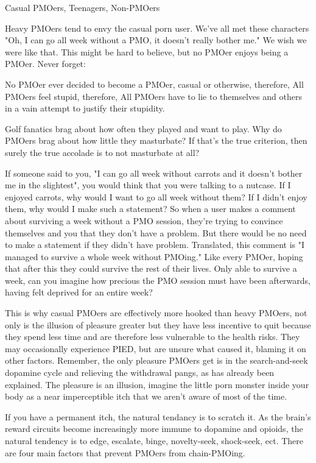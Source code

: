 Casual PMOers, Teenagers, Non-PMOers

Heavy PMOers tend to envy the casual porn user. We've all met these characters "Oh, I can go all week without a PMO, it doesn't really bother me." We wish we were like that. This might be hard to believe, but no PMOer enjoys being a PMOer. Never forget:

  No PMOer ever decided to become a PMOer, casual or otherwise, therefore,
  All PMOers feel stupid, therefore,
  All PMOers have to lie to themselves and others in a vain attempt to justify their stupidity.

Golf fanatics brag about how often they played and want to play. Why do PMOers brag about how little they masturbate? If that's the true criterion, then surely the true accolade is to not masturbate at all?

If someone said to you, "I can go all week without carrots and it doesn't bother me in the slightest", you would think that you were talking to a nutcase. If I enjoyed carrots, why would I want to go all week without them? If I didn't enjoy them, why would I make such a statement? So when a user makes a comment about surviving a week without a PMO session, they're trying to convince themselves and you that they don't have a problem. But there would be no need to make a statement if they didn't have problem. Translated, this comment is "I managed to survive a whole week without PMOing." Like every PMOer, hoping that after this they could survive the rest of their lives. Only able to survive a week, can you imagine how precious the PMO session must have been afterwards, having felt deprived for an entire week?

This is why casual PMOers are effectively more hooked than heavy PMOers, not only is the illusion of pleasure greater but they have less incentive to quit because they spend less time and are therefore less vulnerable to the health risks. They may occasionally experience PIED, but are unsure what caused it, blaming it on other factors. Remember, the only pleasure PMOers get is in the search-and-seek dopamine cycle and relieving the withdrawal pangs, as has already been explained. The pleasure is an illusion, imagine the little porn monster inside your body as a near imperceptible itch that we aren't aware of most of the time.

If you have a permanent itch, the natural tendancy is to scratch it. As the brain's reward circuits become increasingly more immune to dopamine and opioids, the natural tendency is to edge, escalate, binge, novelty-seek, shock-seek, ect. There are four main factors that prevent PMOers from chain-PMOing.

